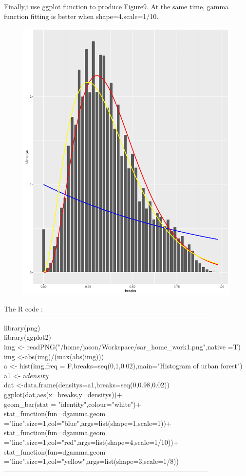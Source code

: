 \documentclass{book} %
\begin{document}
Finally,i use ggplot function to produce Figure9. At the same time, gamma function  fitting is better when shape=4,scale=1/10.
\begin{figure}[H]
	\centering
	\includegraphics[width=0.7\linewidth,height=0.4\textheight]{Rplot}
	\caption{}
	\label{fig:rplot}
\end{figure}

\noindent The R code :\\
------------------------------------------------------------------------------------------\\
library(png)\\
library(ggplot2)\\
img <- readPNG("/home/jason/Workspace/sar\_home\_work1.png",native =T)\\
img <-abs(img)/(max(abs(img)))\\
a <- hist(img,freq = F,breaks=seq(0,1,0.02),main="Histogram of urban forest")\\
a1 <- a$density$\\
dat <-data.frame(densitys=a1,breaks=seq(0,0.98,0.02))\\
ggplot(dat,aes(x=breaks,y=densitys))+\\
geom\_bar(stat = "identity",colour="white")+\\
stat\_function(fun=dgamma,geom\\ ="line",size=1,col="blue",args=list(shape=1,scale=1))+\\
stat\_function(fun=dgamma,geom\\ ="line",size=1,col="red",args=list(shape=4,scale=1/10))+\\
stat\_function(fun=dgamma,geom\\ ="line",size=1,col="yellow",args=list(shape=3,scale=1/8))\\
------------------------------------------------------------------------------------------\\
\end{document}
